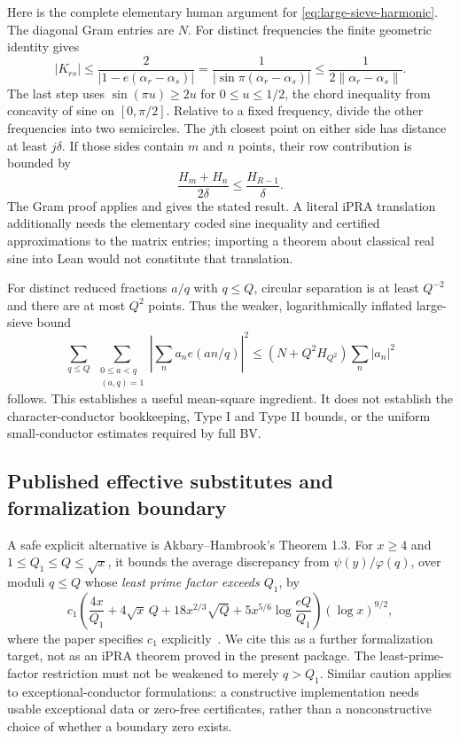 Here is the complete elementary human argument for
\eqref{eq:large-sieve-harmonic}. The diagonal Gram entries are $N$.
For distinct frequencies the finite geometric identity gives
\[
 |K_{rs}|
 \leq\frac{2}{|1-e(\alpha_r-\alpha_s)|}
 =\frac1{|\sin\pi(\alpha_r-\alpha_s)|}
 \leq\frac1{2\|\alpha_r-\alpha_s\|}.
\]
The last step uses $\sin(\pi u)\geq2u$ for $0\leq u\leq1/2$,
the chord inequality from concavity of sine on $[0,\pi/2]$.
Relative to a fixed frequency, divide the other frequencies into two
semicircles. The $j$th closest point on either side has distance at least
$j\delta$. If those sides contain $m$ and $n$ points, their row
contribution is bounded by
\[
 \frac{H_m+H_n}{2\delta}\leq\frac{H_{R-1}}\delta.
\]
The Gram proof applies and gives the stated result. A literal iPRA
translation additionally needs the elementary coded sine inequality
and certified approximations to the matrix entries; importing a theorem
about classical real sine into Lean would not constitute that
translation.

For distinct reduced fractions $a/q$ with $q\leq Q$, circular
separation is at least $Q^{-2}$ and there are at most $Q^2$ points.
Thus the weaker, logarithmically inflated large-sieve bound
\[
 \sum_{q\leq Q}\ \sum_{\substack{0\leq a<q\\(a,q)=1}}
   \left|\sum_n a_ne(an/q)\right|^2
 \leq \left(N+Q^2H_{Q^2}\right)\sum_n|a_n|^2
\]
follows. This establishes a useful mean-square ingredient. It does not
establish the character-conductor bookkeeping, Type I and Type II
bounds, or the uniform small-conductor estimates required by full BV.

\subsection{Published effective substitutes and formalization boundary}

A safe explicit alternative is Akbary--Hambrook's Theorem 1.3.
For $x\geq4$ and $1\leq Q_1\leq Q\leq\sqrt x$, it bounds the
average discrepancy from $\psi(y)/\varphi(q)$, over moduli
$q\leq Q$ whose \emph{least prime factor exceeds $Q_1$}, by
\[
 c_1\left(
 \frac{4x}{Q_1}+4\sqrt x\,Q+18x^{2/3}\sqrt Q
       +5x^{5/6}\log\frac{eQ}{Q_1}
 \right)(\log x)^{9/2},
\]
where the paper specifies $c_1$ explicitly~\cite{AkbaryHambrook}.
We cite this as a further formalization target, not as an iPRA theorem
proved in the present package. The least-prime-factor restriction must
not be weakened to merely $q>Q_1$. Similar caution applies to
exceptional-conductor formulations: a constructive implementation
needs usable exceptional data or zero-free certificates, rather than a
nonconstructive choice of whether a boundary zero exists.

